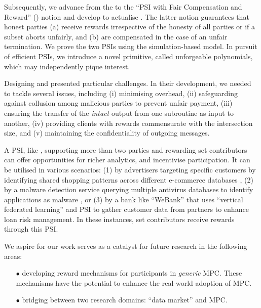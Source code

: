 Subsequently, we advance from the \p to the ``PSI with Fair Compensation and Reward'' (\ep) notion and develop \withRew to actualise \ep. The latter notion guarantees that honest parties (a) receive rewards irrespective of the honesty of all parties or if a subset aborts unfairly, and (b) are compensated in the case of an unfair termination. We prove the two PSIs using the simulation-based model. In pursuit of efficient PSIs, we introduce a novel primitive, called unforgeable polynomials, which may independently pique interest. 


Designing \withFai and \withRew presented particular challenges. In their development, we needed to tackle several issues, including (i) minimising overhead, (ii) safeguarding against collusion among malicious parties to prevent unfair payment, (iii) ensuring the transfer of the \textit{intact} output from one subroutine as input to another, (iv) providing clients with rewards commensurate with the intersection size, and (v) maintaining the confidentiality of outgoing messages.






A PSI, like \withRew, supporting more than two parties and rewarding set contributors can offer opportunities for richer analytics, and incentivise participation.  It can be utilised in various scenarios: (1) by advertisers targeting specific customers by identifying shared shopping patterns across different e-commerce databases \cite{IonKNPSS0SY20}, (2) by a malware detection service querying multiple antivirus databases to identify applications as malware \cite{TamrakarLPEPA17}, or (3) by a bank like ``WeBank'' \cite{ChengLCY20}  that uses  ``vertical federated learning''   and PSI to gather customer data from partners to enhance loan risk management. In these instances, set contributors receive rewards through this PSI. 

We aspire for our work serves as a catalyst for future research in the following areas:


\vspace{-3mm}
 \begin{itemize}
 
 \item[$\bullet$] developing reward mechanisms for participants in \textit{generic} MPC. These mechanisms have the potential to enhance the real-world adoption of MPC. 

\item[$\bullet$] bridging between two research domains: ``data market'' \cite{golob2023decentralized,KochKMMR22,abs-2210-08723} and MPC. 

\end{itemize}

